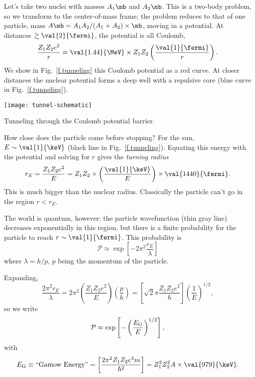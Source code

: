 Let's take two nuclei with masses $A_{1}\mb$ and $A_{2}\mb$. This is a two-body problem, so we transform to the center-of-mass frame; the problem reduces to that of one particle, mass $A\mb = A_{1}A_{2}/(A_{1}+A_{2})\times\mb$, moving in a potential.  At distances $\gtrsim \val{2}{\fermi}$, the potential is all Coulomb,
\[ \frac{Z_{1}Z_{2}e^{2}}{r} = \val{1.44}{\MeV}\times Z_{1}Z_{2}\left(\frac{\val{1}{\fermi}}{r}\right). \]
We show in Fig.~\ref{f.tunneling} this Coulomb potential as a red curve.
At closer distances the nuclear potential forms a deep well with a repulsive core (blue curve in Fig.~\ref{f.tunneling}).

\begin{marginfigure}
\texttt{[image: tunnel-schematic]}
\caption{Tunneling through the Coulomb potential barrier.}
\label{f.tunneling}
\end{marginfigure}

 How close does the particle come before stopping? For the sun, $E \sim \val{1}{\keV}$ (black line in Fig.~\ref{f.tunneling}).  Equating this energy with the potential and solving for $r$ gives the \emph{turning radius}
\begin{equation}
	r_{E} = \frac{Z_{1}Z_{2}e^{2}}{E} = Z_{1}Z_{2}\times \left(\frac{\val{1}{\keV}}{E}\right) \times \val{1440}{\fermi}.
\end{equation}
This is much bigger than the nuclear radius.  Classically the particle can't go in the region $r<r_{E}$.

The world is quantum, however: the particle wavefunction (thin gray line) decreases exponentially in this region, but there is a finite probability for the particle to reach $r\sim\val{1}{\fermi}$.  This probability is
\[ \mathcal{P}\approx \exp\left[-2\pi^{2}\frac{r_{E}}{\lambda}\right] \]
where $\lambda = h/p$, $p$ being the momentum of the particle.

Expanding,
\[ \frac{2\pi^{2}r_{E}}{\lambda} = 2\pi^{2}\left(\frac{Z_{1}Z_{2}e^{2}}{E}\right)
	\left(\frac{p}{h}\right) = \left[\sqrt{2}\pi \frac{Z_{1}Z_{2}e^{2}}{\hbar}\right]\left(\frac{1}{E}\right)^{1/2}, \]
so we write
\begin{equation}
\mathcal{P} \approx \exp\left[-\left(\frac{E_{\mathrm{G}}}{E}\right)^{1/2}\right],
\end{equation}
with
\[ \EG \equiv \textrm{``Gamow Energy''} = \left[\frac{2\pi^{2}Z_{1}Z_{2}e^{4}m}{\hbar^{2}}\right] = Z_{1}^{2}Z_{2}^{2}A \times \val{979}{\keV}.
\]

